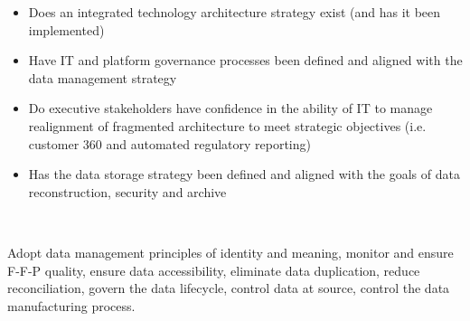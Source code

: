 \begin{description}[nosep,font=\bfseries]
  \begin{itemize}
    \item Does an integrated technology architecture strategy exist (and has it been implemented)
    \item Have IT and platform governance processes been defined and aligned with the data management strategy
    \item Do executive stakeholders have confidence in the ability of IT to manage realignment of fragmented architecture to meet strategic objectives (i.e. customer 360 and automated regulatory reporting)
    \item Has the data storage strategy been defined and aligned with the goals of data reconstruction, security and archive
  \end{itemize}
  ~\\
  \item [High-Level Data Goals]
  Adopt data management principles of identity and meaning, 
  monitor and ensure F-F-P quality, ensure data accessibility, 
  eliminate data duplication, reduce reconciliation, 
  govern the data lifecycle, control data at source, 
  control the data manufacturing process. \\


\end{description}
